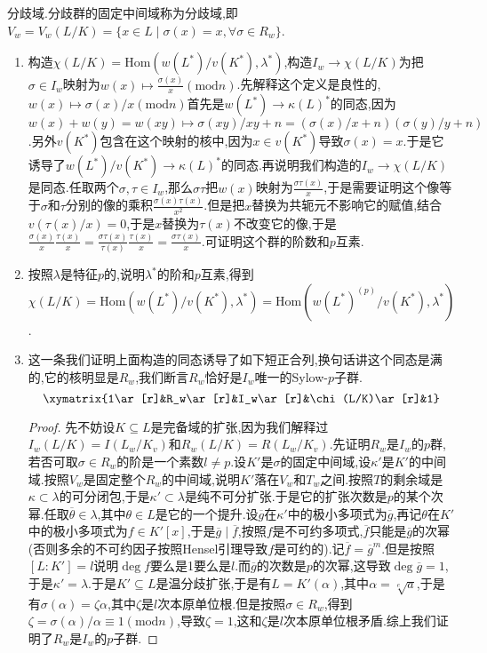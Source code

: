 分歧域.分歧群的固定中间域称为分歧域,即$V_w=V_w(L/K)=\{x\in L\mid\sigma(x)=x,\forall\sigma\in R_w\}$.
\begin{enumerate}
	\item 构造$\chi(L/K)=\mathrm{Hom}(w(L^*)/v(K^*),\lambda^*)$,构造$I_w\to\chi(L/K)$为把$\sigma\in I_w$映射为$w(x)\mapsto\frac{\sigma(x)}{x}(\mathrm{mod}n)$.先解释这个定义是良性的,$w(x)\mapsto\sigma(x)/x(\mathrm{mod}n)$首先是$w(L^*)\to\kappa(L)^*$的同态,因为$w(x)+w(y)=w(xy)\mapsto \sigma(xy)/xy+n=(\sigma(x)/x+n)(\sigma(y)/y+n)$.另外$v(K^*)$包含在这个映射的核中,因为$x\in v(K^*)$导致$\sigma(x)=x$.于是它诱导了$w(L^*)/v(K^*)\to\kappa(L)^*$的同态.再说明我们构造的$I_w\to\chi(L/K)$是同态.任取两个$\sigma,\tau\in I_w$,那么$\sigma\tau$把$w(x)$映射为$\frac{\sigma\tau(x)}{x}$,于是需要证明这个像等于$\sigma$和$\tau$分别的像的乘积$\frac{\sigma(x)\tau(x)}{x^2}$.但是把$x$替换为共轭元不影响它的赋值,结合$v(\tau(x)/x)=0$,于是$x$替换为$\tau(x)$不改变它的像,于是$\frac{\sigma(x)}{x}\frac{\tau(x)}{x}=\frac{\sigma\tau(x)}{\tau(x)}\frac{\tau(x)}{x}=\frac{\sigma\tau(x)}{x}$.可证明这个群的阶数和$p$互素.
	\item 按照$\lambda$是特征$p$的,说明$\lambda^*$的阶和$p$互素,得到$\chi(L/K)=\mathrm{Hom}(w(L^*)/v(K^*),\lambda^*)=\mathrm{Hom}(w(L^*)^{(p)}/v(K^*),\lambda^*)$.
	\item 这一条我们证明上面构造的同态诱导了如下短正合列,换句话讲这个同态是满的,它的核明显是$R_w$,我们断言$R_w$恰好是$I_w$唯一的Sylow-$p$子群.
	$$\xymatrix{1\ar[r]&R_w\ar[r]&I_w\ar[r]&\chi(L/K)\ar[r]&1}$$
	\begin{proof}
		
		先不妨设$K\subseteq L$是完备域的扩张,因为我们解释过$I_w(L/K)=I(L_w/K_v)$和$R_w(L/K)=R(L_w/K_v)$.先证明$R_w$是$I_w$的$p$群,若否可取$\sigma\in R_w$的阶是一个素数$l\not=p$.设$K'$是$\sigma$的固定中间域,设$\kappa'$是$K'$的中间域.按照$V_w$是固定整个$R_w$的中间域,说明$K'$落在$V_w$和$T_w$之间.按照$T$的剩余域是$\kappa\subset\lambda$的可分闭包,于是$\kappa'\subset\lambda$是纯不可分扩张.于是它的扩张次数是$p$的某个次幂.任取$\overline{\theta}\in\lambda$,其中$\theta\in L$是它的一个提升.设$\overline{g}$在$\kappa'$中的极小多项式为$\overline{g}$,再记$\theta$在$K'$中的极小多项式为$f\in K'[x]$,于是$\overline{g}\mid\overline{f}$,按照$f$是不可约多项式,$\overline{f}$只能是$\overline{g}$的次幂(否则多余的不可约因子按照Hensel引理导致$f$是可约的).记$\overline{f}=\overline{g}^m$.但是按照$[L:K']=l$说明$\deg f$要么是1要么是$l$.而$\overline{g}$的次数是$p$的次幂,这导致$\deg\overline{g}=1$,于是$\kappa'=\lambda$.于是$K'\subseteq L$是温分歧扩张,于是有$L=K'(\alpha)$,其中$\alpha=\sqrt[e]{a}$,于是有$\sigma(\alpha)=\zeta\alpha$,其中$\zeta$是$l$次本原单位根.但是按照$\sigma\in R_w$,得到$\zeta=\sigma(\alpha)/\alpha\equiv1(\mathrm{mod}n)$,导致$\zeta=1$,这和$\zeta$是$l$次本原单位根矛盾.综上我们证明了$R_w$是$I_w$的$p$子群.
		

\end{proof}
\end{enumerate}

